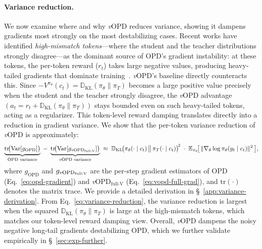 \documentclass{article}
\newcommand{\method}{\emph{v}OPD}
\begin{document}
\paragraph{Variance reduction.}
We now examine where and why \method{} reduces variance, showing it dampens gradients most strongly on the most destabilizing cases. Recent works have identified \emph{high-mismatch tokens}---where the student and the teacher distributions strongly disagree---as the dominant source of OPD's gradient instability: at these tokens, the per-token reward ($r_t$) takes large negative values, producing heavy-tailed gradients that dominate training~\citep{ko2026scaling, li2026rethinkingopd}. \method{}'s baseline directly counteracts this. Since $-V^{\pi_\theta}(c_t) = \mathbb{D}_\mathrm{KL}(\pi_\theta\|\pi_T)$ becomes a large positive value precisely when the student and the teacher strongly disagree, the \method{} advantage $(a_t=r_t+\mathbb{D}_\mathrm{KL}(\pi_\theta\|\pi_T))$ stays bounded even on such heavy-tailed tokens, acting as a regularizer. This token-level reward damping translates directly into a reduction in gradient variance. We show that the per-token variance reduction of \method{} is approximately:
\begin{equation}
\label{eq:variance-reduction}
\underbrace{\mathrm{tr}\!\bigl(\mathrm{Var}[g_\text{OPD}]\bigr)}_{\text{OPD variance}}
\;-\;
\underbrace{\mathrm{tr}\!\bigl(\mathrm{Var}[g_{\text{\method}_{\text{full-V}}}]\bigr)}_{\text{\method{} variance}}
\;\approx\;
\mathbb{D}_\mathrm{KL}\!\bigl(\pi_\theta(\cdot\mid c_t) \,\big\|\, \pi_T(\cdot\mid c_t)\bigr)^{\!2}
\;\cdot\;
\mathbb{E}_{\pi_\theta}\!\bigl[\,\|\nabla_\theta \log \pi_\theta(y_t\mid c_t)\|^2\,\bigr],
\end{equation}
where $g_\text{OPD}$ and $g_{\text{\method}_{\text{full-V}}}$ are the per-step gradient estimators of OPD (Eq.~\eqref{eq:opd-gradient}) and \method$_{\text{full-V}}$ (Eq.~\eqref{eq:vopd-full-grad}), and $\mathrm{tr}(\cdot)$ denotes the matrix trace. We provide a detailed derivation in \S~\ref{app:variance-derivation}. From Eq.~\eqref{eq:variance-reduction}, the variance reduction is largest when the squared $\mathbb{D}_\mathrm{KL}(\pi_\theta\|\pi_T)$ is large at the high-mismatch tokens, which matches our token-level reward damping view. Overall, \method{} dampens the noisy negative long-tail gradients destabilizing OPD, which we further validate empirically in \S~\ref{sec:exp-further}.
\end{document}
